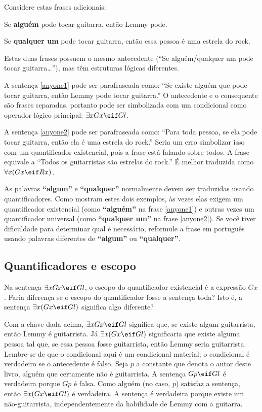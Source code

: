 Considere estas frases adicionais:

\begin{earg}
\item[\ex{anyone1}] Se \textbf{alguém} pode tocar guitarra, então Lemmy pode.
\item[\ex{anyone2}] Se \textbf{qualquer um} pode tocar guitarra, então essa pessoa é uma estrela do rock.
\end{earg}

Estas duas frases possuem o mesmo antecedente (``Se alguém/qualquer um pode tocar guitarra\ldots''), mas têm estruturas lógicas diferentes.

A sentença \ref{anyone1} pode ser parafraseada como: ``Se existe alguém que pode tocar guitarra, então Lemmy pode tocar guitarra.'' O antecedente e o consequente são frases separadas, portanto pode ser simbolizada com um condicional como operador lógico principal: $\exists x Gx \eif Gl$.

A sentença \ref{anyone2} pode ser parafraseada como: ``Para toda pessoa, se ela pode tocar guitarra, então ela é uma estrela do rock.'' Seria um erro simbolizar isso com um quantificador existencial, pois a frase está falando sobre todos. A frase equivale a ``Todos os guitarristas são estrelas do rock.'' É melhor traduzida como $\forall x(Gx \eif Rx)$.

As palavras \textbf{``algum''} e \textbf{``qualquer''} normalmente devem ser traduzidas usando quantificadores. Como mostram estes dois exemplos, às vezes elas exigem um quantificador existencial (como \textbf{``alguém''} na frase \ref{anyone1}) e outras vezes um quantificador universal (como \textbf{``qualquer um''} na frase \ref{anyone2}). Se você tiver dificuldade para determinar qual é necessário, reformule a frase em português usando palavras diferentes de \textbf{``algum''} ou \textbf{``qualquer''}.

\subsection{Quantificadores e escopo}

Na sentença $\exists x Gx \eif Gl$, o escopo do quantificador existencial é a expressão $Gx$. Faria diferença se o escopo do quantificador fosse a sentença toda? Isto é, a sentença $\exists x (Gx \eif Gl)$ significa algo diferente?

Com a chave dada acima, $\exists x Gx \eif Gl$ significa que, se existe algum guitarrista, então Lemmy é guitarrista. Já $\exists x (Gx \eif Gl)$ significaria que existe alguma pessoa tal que, se essa pessoa fosse guitarrista, então Lemmy seria guitarrista. Lembre-se de que o condicional aqui é um condicional material; o condicional é verdadeiro se o antecedente é falso. Seja $p$ a constante que denota o autor deste livro, alguém que certamente não é guitarrista. A sentença $Gp \eif Gl$ é verdadeira porque $Gp$ é falsa. Como alguém (no caso, $p$) satisfaz a sentença, então $\exists x (Gx \eif Gl)$ é verdadeira. A sentença é verdadeira porque existe um não-guitarrista, independentemente da habilidade de Lemmy com a guitarra.


